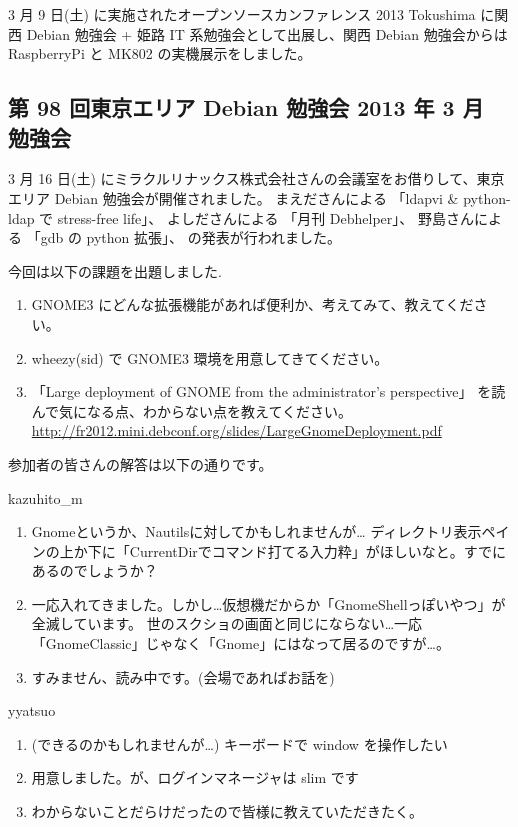 \documentclass[mingoth,a4paper]{jsarticle}
\begin{document}
3 月 9 日(土) に実施されたオープンソースカンファレンス 2013 Tokushima 
に関西 Debian 勉強会 + 姫路 IT 系勉強会として出展し、関西 Debian 勉強会からは
RaspberryPi と MK802 の実機展示をしました。

\subsection{第 98 回東京エリア Debian 勉強会 2013 年 3 月 勉強会}
3 月 16 日(土) にミラクルリナックス株式会社さんの会議室をお借りして、東京エリア 
Debian 勉強会が開催されました。
まえださんによる 「ldapvi \& python-ldap で stress-free life」、
よしださんによる 「月刊 Debhelper」、
野島さんによる 「gdb の python 拡張」、
の発表が行われました。


今回は以下の課題を出題しました.
\begin{screen}
  \begin{enumerate}
  \item GNOME3 にどんな拡張機能があれば便利か、考えてみて、教えてください。
  \item wheezy(sid) で GNOME3 環境を用意してきてください。
  \item 「Large deployment of GNOME from the administrator's perspective」
    を読んで気になる点、わからない点を教えてください。
    \url{http://fr2012.mini.debconf.org/slides/LargeGnomeDeployment.pdf}
  \end{enumerate}
\end{screen}

参加者の皆さんの解答は以下の通りです。

\begin{prework}{kazuhito\_m}
  \begin{enumerate}
  \item Gnomeというか、Nautilsに対してかもしれませんが…
        ディレクトリ表示ペインの上か下に「CurrentDirでコマンド打てる入力粋」がほしいなと。すでにあるのでしょうか？
  \item 一応入れてきました。しかし…仮想機だからか「GnomeShellっぽいやつ」が全滅しています。
        世のスクショの画面と同じにならない…一応「GnomeClassic」じゃなく「Gnome」にはなって居るのですが…。 
  \item すみません、読み中です。(会場であればお話を)
  \end{enumerate}
\end{prework}

\begin{prework}{yyatsuo}
  \begin{enumerate}
  \item  (できるのかもしれませんが…) キーボードで window を操作したい 
  \item 用意しました。が、ログインマネージャは slim です
  \item わからないことだらけだったので皆様に教えていただきたく。
  \end{enumerate}
\end{prework}
\end{document}

